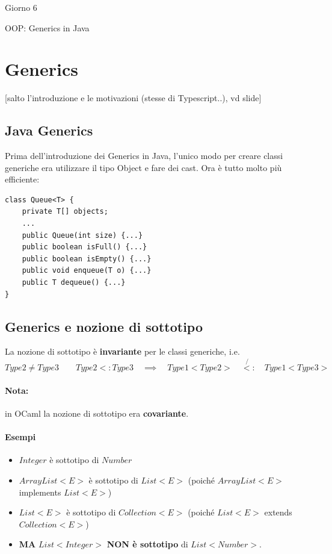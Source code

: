 \documentclass[a4paper,10pt]{article}
\begin{document}
\begin{center}
    \LARGE Giorno 6\smallskip

    \Large OOP: Generics in Java
\end{center}\smallskip

\begin{abstract}

\end{abstract}

\section{Generics}
[salto l'introduzione e le motivazioni (stesse di Typescript..), vd slide]
\subsection{Java Generics}
Prima dell'introduzione dei Generics in Java, l'unico modo per creare classi generiche era utilizzare il tipo Object e fare dei cast. Ora è tutto molto più efficiente:
\begin{lstlisting}
class Queue<T> {
    private T[] objects;
    ...
    public Queue(int size) {...}
    public boolean isFull() {...}
    public boolean isEmpty() {...}
    public void enqueue(T o) {...}
    public T dequeue() {...}
}

\end{lstlisting}

\subsection{Generics e nozione di sottotipo}
La nozione di sottotipo è \textbf{invariante} per le classi generiche, i.e. \[ Type2 \neq Type3 \quad\quad Type2 <: Type3 \quad\implies \quad Type1<Type2> \quad\not {<:} \quad Type1<Type3>\]

\paragraph{Nota:} in OCaml la nozione di sottotipo era \textbf{covariante}.

\paragraph{Esempi}
\begin{itemize}
 \item $Integer$ è sottotipo di $Number$
 \item $ArrayList<E>$ è sottotipo di $List<E>$ (poiché $ArrayList<E>$ implements $List<E>$)
 \item $List<E>$ è sottotipo di $Collection<E>$ (poiché $List<E>$ extends $Collection<E>$)
 \item \textbf{MA} $List<Integer>$ \textbf{NON è sottotipo} di $List<Number>$.
\end{itemize}
\end{document}
